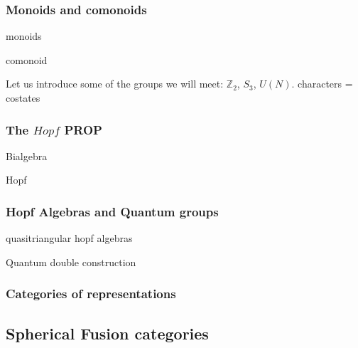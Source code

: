 \documentclass{article}
\newenvironment{definition}[1][Definition]{\begin{trivlist}
\item[\hskip \labelsep {\bfseries #1}]}{\end{trivlist}}
\begin{document}
\subsubsection{Monoids and comonoids}
\begin{definition}
monoids
\end{definition}
\begin{definition}
comonoid
\end{definition}
Let us introduce some of the groups we will meet: $\mathbb{Z}_2$, $S_3$, $U(N)$.
characters = costates

\subsubsection{The $Hopf$ PROP}
\begin{definition}
Bialgebra
\end{definition}
\begin{definition}{Hopf}

\end{definition}

\subsubsection{Hopf Algebras and Quantum groups}
quasitriangular hopf algebras \\
\begin{definition}
Quantum double construction
\end{definition}

\subsubsection{Categories of representations}


\subsection{Spherical Fusion categories}
\end{document}
